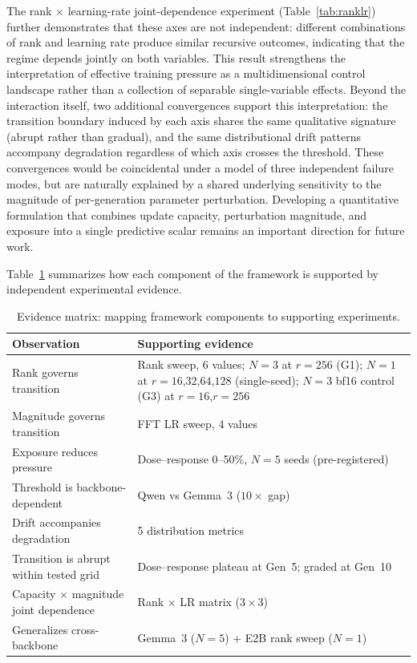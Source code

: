 \documentclass[a4paper,fleqn]{cas-dc}
\newif\ifshowchanges
\newcommand{\rev}[1]{\ifshowchanges{\color{blue}#1}\else{#1}\fi}
\renewcommand{\arraystretch}{1.8}
\begin{document}
The rank $\times$ learning-rate joint-dependence experiment
(Table~\ref{tab:ranklr}) further demonstrates that these axes are not
independent: different combinations of rank and learning rate produce similar
recursive outcomes, indicating that the regime depends jointly on both variables.
This result strengthens the interpretation of effective training pressure as a
multidimensional control landscape rather than a collection of separable
single-variable effects. Beyond the interaction itself, two additional
convergences support this interpretation:
the transition boundary induced by each axis shares the same qualitative
signature (abrupt rather than gradual), and the same distributional drift patterns
accompany degradation regardless of which axis crosses the threshold. These
convergences would be coincidental under a model of three independent failure
modes, but are naturally explained by a shared underlying sensitivity to the
magnitude of per-generation parameter perturbation. Developing a quantitative
formulation that combines update capacity, perturbation magnitude, and exposure
into a single predictive scalar remains an important direction for future work.

Table~\ref{tab:evidence} summarizes how each component of the framework is
supported by independent experimental evidence.

\begin{table}[tp]
\caption{Evidence matrix: mapping framework components to supporting
experiments.}\label{tab:evidence}
\footnotesize
\renewcommand{\arraystretch}{1.4}
\begin{tabularx}{\columnwidth}{@{}lX@{}}
\toprule
\textbf{Observation} & \textbf{Supporting evidence} \\
\midrule
Rank governs transition & \rev{Rank sweep, 6 values; $N{=}3$ at $r{=}256$ (G1); $N{=}1$ at $r{=}16$,$32$,$64$,$128$ (single-seed); $N{=}3$ bf16 control (G3) at $r{=}16$,$r{=}256$} \\
\addlinespace
Magnitude governs transition & FFT LR sweep, 4 values \\
\addlinespace
\rev{Exposure reduces pressure} & \rev{Dose--response 0--50\%, $N{=}5$ seeds (pre-registered)} \\
\addlinespace
Threshold is backbone-dependent & Qwen vs Gemma~3 ($10{\times}$ gap) \\
\addlinespace
Drift accompanies degradation & 5 distribution metrics \\
\addlinespace
\rev{Transition is abrupt within tested grid} & \rev{Dose--response plateau at Gen~5; graded at Gen~10} \\
\addlinespace
Capacity $\times$ magnitude \rev{joint dependence} & Rank $\times$ LR matrix ($3{\times}3$) \\
\addlinespace
Generalizes cross-backbone & Gemma~3 ($N=5$) + \rev{E2B rank sweep ($N=1$)} \\
\bottomrule
\end{tabularx}
\end{table}
\end{document}
